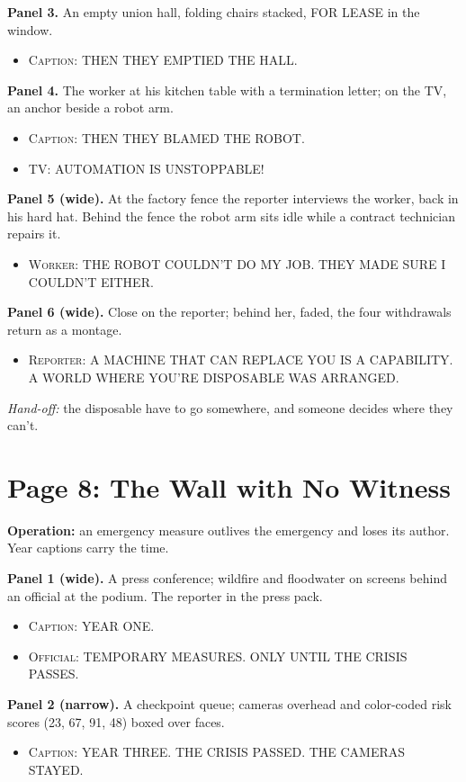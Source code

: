 \documentclass[11pt]{article}
\newcommand{\op}[1]{\textbf{Operation:} #1\par}
\newcommand{\panel}[2]{\textbf{#1.} #2\par}
\newenvironment{lines}{\begin{itemize}[label={},leftmargin=1.5em,itemsep=0.05em,topsep=0.1em]}{\end{itemize}}
\newcommand{\say}[2]{\item \textsc{#1}: \textsf{\small #2}}
\newcommand{\handoff}[1]{\emph{Hand-off:} #1\par}
\begin{document}
\panel{Panel 3}{An empty union hall, folding chairs stacked, \textsf{\small FOR LEASE} in the window.}
\begin{lines}\say{Caption}{THEN THEY EMPTIED THE HALL.}\end{lines}

\panel{Panel 4}{The worker at his kitchen table with a termination letter; on the TV, an anchor beside a robot arm.}
\begin{lines}\say{Caption}{THEN THEY BLAMED THE ROBOT.}\say{TV}{AUTOMATION IS UNSTOPPABLE!}\end{lines}

\panel{Panel 5 (wide)}{At the factory fence the reporter interviews the worker, back in his hard hat. Behind the fence the robot arm sits idle while a contract technician repairs it.}
\begin{lines}\say{Worker}{THE ROBOT COULDN'T DO MY JOB. THEY MADE SURE I COULDN'T EITHER.}\end{lines}

\panel{Panel 6 (wide)}{Close on the reporter; behind her, faded, the four withdrawals return as a montage.}
\begin{lines}\say{Reporter}{A MACHINE THAT CAN REPLACE YOU IS A CAPABILITY. A WORLD WHERE YOU'RE DISPOSABLE WAS ARRANGED.}\end{lines}

\handoff{the disposable have to go somewhere, and someone decides where they can't.}

\section{Page 8: The Wall with No Witness}

\op{an emergency measure outlives the emergency and loses its author. Year captions carry the time.}

\panel{Panel 1 (wide)}{A press conference; wildfire and floodwater on screens behind an official at the podium. The reporter in the press pack.}
\begin{lines}\say{Caption}{YEAR ONE.}\say{Official}{TEMPORARY MEASURES. ONLY UNTIL THE CRISIS PASSES.}\end{lines}

\panel{Panel 2 (narrow)}{A checkpoint queue; cameras overhead and color-coded risk scores (23, 67, 91, 48) boxed over faces.}
\begin{lines}\say{Caption}{YEAR THREE. THE CRISIS PASSED. THE CAMERAS STAYED.}\end{lines}
\end{document}
